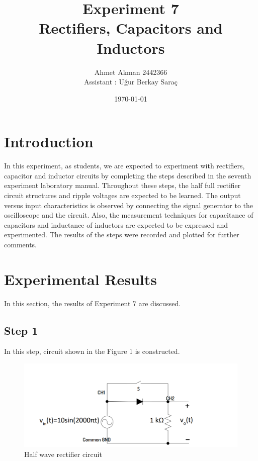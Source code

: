\documentclass[letterpaper,12pt]{article}
\begin{document}
\title{Experiment 7 \protect\\Rectifiers, Capacitors and Inductors}
\author{Ahmet Akman 2442366 \protect\\ Assistant : Uğur Berkay Saraç}
\date{\today}
\maketitle
\newpage
\tableofcontents
\newpage

\section{Introduction} 
In this experiment, as students, we are expected to experiment with rectifiers, capacitor and inductor circuits by completing the steps described in the seventh experiment laboratory manual. Throughout these steps, the half  full rectifier circuit structures and ripple voltages are expected to be learned. The output versus input characteristics is observed by connecting the signal generator to the oscilloscope and the circuit.  Also, the measurement techniques for capacitance of capacitors and inductance of inductors are expected to be expressed and experimented. The results of the steps were recorded and plotted for further comments.
\section{Experimental Results}
In this section, the results of Experiment 7 are discussed. 
\subsection{Step 1}
In this step, circuit shown in the Figure 1  is constructed. 
\begin{figure}[H]
	\centering
   \includegraphics[width=1\textwidth]{half_vave_sch.png}
   \caption{Half wave rectifier circuit}
\end{figure}
\end{document}
